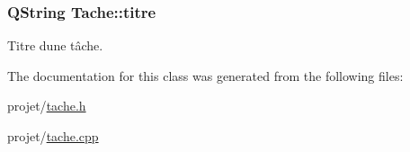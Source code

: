 \subsubsection[{titre}]{\setlength{\rightskip}{0pt plus 5cm}Q\+String Tache\+::titre\hspace{0.3cm}{\ttfamily [protected]}}\label{class_tache_a1d3d20046c0c4cc8482f71bb555b79cf}
Titre d\textquotesingle{}une tâche. 

The documentation for this class was generated from the following files\+:\begin{DoxyCompactItemize}
\item 
projet/\hyperlink{tache_8h}{tache.\+h}\item 
projet/\hyperlink{tache_8cpp}{tache.\+cpp}\end{DoxyCompactItemize}
